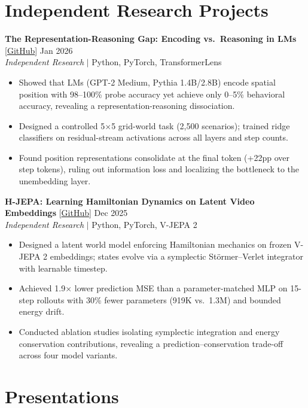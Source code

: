 \documentclass[11pt,letterpaper]{article}
\begin{document}
\section{Independent Research Projects}

\textbf{The Representation-Reasoning Gap: Encoding vs.\ Reasoning in LMs}
[\href{https://github.com/jefreybergl/The-Represenation-Reasoning-Gap}{GitHub}] \hfill Jan 2026 \\
\textit{Independent Research} $\vert$ Python, PyTorch, TransformerLens \\[-6pt]
\begin{itemize}
    \item Showed that LMs (GPT-2 Medium, Pythia 1.4B/2.8B) encode spatial position with 98--100\% probe accuracy yet achieve only 0--5\% behavioral accuracy, revealing a representation-reasoning dissociation.
    \item Designed a controlled 5$\times$5 grid-world task (2,500 scenarios); trained ridge classifiers on residual-stream activations across all layers and step counts.
    \item Found position representations consolidate at the final token (+22pp over step tokens), ruling out information loss and localizing the bottleneck to the unembedding layer.
\end{itemize}

\textbf{H-JEPA: Learning Hamiltonian Dynamics on Latent Video Embeddings}
[\href{https://github.com/jefreybergl/H-JEPA}{GitHub}] \hfill Dec 2025 \\
\textit{Independent Research} $\vert$ Python, PyTorch, V-JEPA 2 \\[-6pt]
\begin{itemize}
    \item Designed a latent world model enforcing Hamiltonian mechanics on frozen V-JEPA 2 embeddings; states evolve via a symplectic St\"{o}rmer--Verlet integrator with learnable timestep.
    \item Achieved 1.9$\times$ lower prediction MSE than a parameter-matched MLP on 15-step rollouts with 30\% fewer parameters (919K vs.\ 1.3M) and bounded energy drift.
    \item Conducted ablation studies isolating symplectic integration and energy conservation contributions, revealing a prediction--conservation trade-off across four model variants.
\end{itemize}

\section{Presentations}
\end{document}

